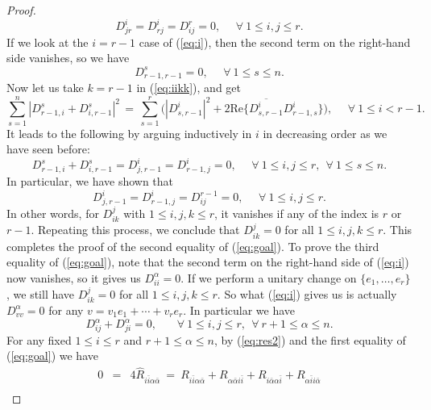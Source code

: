 \documentclass[10pt,a4paper]{amsart}
\begin{document}
\begin{proof}
\begin{equation*}  \label{eq:claimDr}
 D^i_{jr}=D^i_{rj}=D^r_{ij} =0, \ \ \ \ \ \ \forall \ 1\leq i,j\leq r.
 \end{equation*}
If we look at the $i=r\!-\!1$ case of (\ref{eq:i}), then the second term on the right-hand side vanishes, so we have
\begin{equation}  \label{eq:Dr-1r-1}
 D^s_{r\!-\!1,r\!-\!1}=0, \ \ \ \ \ \ \forall \ 1\leq s\leq n.
 \end{equation}
Now let us take $k=r\!-\!1$ in (\ref{eq:iikk}), and get
\begin{equation}  \label{eq:iir-1r-1}
 \sum_{s=1}^n |D^s_{r\!-\!1,i}+D^s_{i,r\!-\!1}|^2 \, = \, \sum_{s=1}^r \big(  |D^i_{s,r\!-\!1}|^2 + 2\mbox{Re} \{  \overline{D^i_{s,r\!-\!1}} D^i_{r\!-\!1,s} \} \big) , \ \ \ \ \ \ \forall \ 1\leq i<r\!-\!1.
 \end{equation}
It leads to the following by arguing inductively in $i$ in decreasing order as we have seen before:
\begin{equation}  \label{eq:claimr-1}
 D^s_{r\!-\!1,i}+D^s_{i,r\!-\!1}=D^i_{j,r\!-\!1}=D^i_{r\!-\!1,j}=0, \ \ \ \ \ \ \forall \ 1\leq i,j\leq r, \ \ \forall \ 1\leq s\leq n.
 \end{equation}
In particular, we have shown that
$$ D^i_{j,r\!-\!1}=D^i_{r\!-\!1,j}=D^{r\!-\!1}_{ij} =0, \ \ \ \ \ \ \forall \ 1\leq i,j\leq r. $$
In other words, for $D^j_{ik}$ with $1\leq i,j,k\leq r$, it vanishes if any of the index is $r$ or $r\!-\!1$. Repeating this process, we conclude that 
$D^j_{ik}=0$ for all  $1\leq i,j,k\leq r$. This completes the proof of the second equality of (\ref{eq:goal}). To prove the third equality of (\ref{eq:goal}), note that the second term on the right-hand side of (\ref{eq:i}) now vanishes, so it gives us $D^{\alpha}_{ii}=0$. If we perform a unitary change on $\{ e_1, \ldots , e_r\}$, we still have $D^j_{ik}=0$ for all $1\leq i,j,k\leq r$. So what (\ref{eq:i}) gives us is actually $D^{\alpha}_{vv}=0$ for any $v=v_1e_1+\cdots + v_re_r$. In particular we have 
\begin{equation}  \label{eq:Dalphaij}
 D^{\alpha}_{ij}+ D^{\alpha}_{ji} =0 , \ \ \ \ \ \ \ \ \forall \ 1\leq i,j\leq r, \ \ \forall \ r\!+\!1\leq \alpha \leq n.
 \end{equation}
For any fixed $1\leq i\leq r$ and $r\!+\!1\leq \alpha \leq n$, by (\ref{eq:res2}) and the first equality of (\ref{eq:goal}) we have
\begin{eqnarray*}
0 & = & 4\widehat{R}_{i\bar{i}\alpha \bar{\alpha}} \ = \ R_{i\bar{i}\alpha \bar{\alpha}} + R_{\alpha \bar{\alpha}i\bar{i}}  + R_{i\bar{\alpha}\alpha \bar{i}} +R_{\alpha \bar{i}i\bar{\alpha}} \nonumber \\

\end{eqnarray*}
\end{proof}
\end{document}
